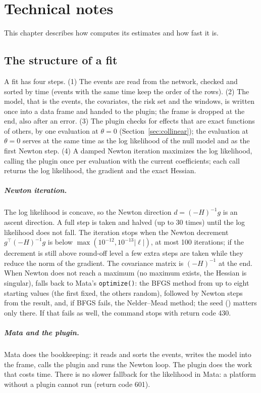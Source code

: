 \chapter{Technical notes}\label{ch:technical}

This chapter describes how \nwrem{} computes its estimates and how fast it is.

\section{The structure of a fit}\label{sec:structure}

A fit has four steps. (1) The events are read from the network, checked and sorted by time (events with the same time keep the order of the rows). (2) The model, that is the events, the covariates, the risk set and the windows, is written once into a data frame and handed to the plugin; the frame is dropped at the end, also after an error. (3) The plugin checks for effects that are exact functions of others, by one evaluation at $\theta=0$ (Section~\ref{sec:collinear}); the evaluation at $\theta=0$ serves at the same time as the log likelihood of the null model and as the first Newton step. (4) A damped Newton iteration maximizes the log likelihood, calling the plugin once per evaluation with the current coefficients; each call returns the log likelihood, the gradient and the exact Hessian.

\paragraph{Newton iteration.} The log likelihood is concave, so the Newton direction $d=(-H)^{-1}g$ is an ascent direction. A full step is taken and halved (up to 30 times) until the log likelihood does not fall. The iteration stops when the Newton decrement $g^{\top}(-H)^{-1}g$ is below $\max(10^{-12},10^{-13}|\ell|)$, at most 100 iterations; if the decrement is still above round-off level a few extra steps are taken while they reduce the norm of the gradient. The covariance matrix is $(-H)^{-1}$ at the end. When Newton does not reach a maximum (no maximum exists, the Hessian is singular), \nwrem{} falls back to Mata's \texttt{optimize()}: the BFGS method from up to eight starting values (the first fixed, the others random), followed by Newton steps from the result, and, if BFGS fails, the Nelder--Mead method; the seed () matters only there. If that fails as well, the command stops with return code 430.

\paragraph{Mata and the plugin.} Mata does the bookkeeping: it reads and sorts the events, writes the model into the frame, calls the plugin and runs the Newton loop. The plugin does the work that costs time. There is no slower fallback for the likelihood in Mata: a platform without a plugin cannot run \nwrem{} (return code 601).

